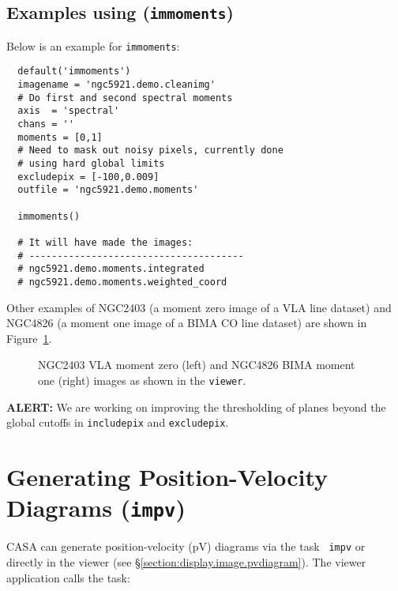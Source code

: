 \subsection{Examples using ({\tt immoments})}
\label{section:analysis.moments.example}

Below is an example for {\tt immoments}:
\small
\begin{verbatim}
  default('immoments')
  imagename = 'ngc5921.demo.cleanimg'
  # Do first and second spectral moments
  axis  = 'spectral'
  chans = ''
  moments = [0,1]
  # Need to mask out noisy pixels, currently done
  # using hard global limits
  excludepix = [-100,0.009]
  outfile = 'ngc5921.demo.moments'
  
  immoments()
  
  # It will have made the images:
  # --------------------------------------
  # ngc5921.demo.moments.integrated
  # ngc5921.demo.moments.weighted_coord
\end{verbatim}
\normalsize

Other examples of NGC2403 (a moment zero image of a VLA line dataset)
and NGC4826 (a moment one image of a BIMA CO line dataset) are
shown in Figure~\ref{fig:n2403momzero}.

\begin{figure}[h!]
\begin{center}
\caption{\label{fig:n2403momzero} NGC2403 VLA moment zero (left) and
NGC4826 BIMA moment one (right) images as shown in the {\tt viewer}.}
\hrulefill
\end{center}
\end{figure}

{\bf ALERT:} We are working on improving the thresholding
of planes beyond the global cutoffs in {\tt includepix}
and {\tt excludepix}.


\section{Generating Position-Velocity Diagrams ({\tt impv})}
\label{section:analysis.pv}
CASA can generate position-velocity (pV) diagrams via the task {\tt
  impv} or directly in the viewer (see
\S\ref{section:display.image.pvdiagram}). The viewer application calls
the task: 

